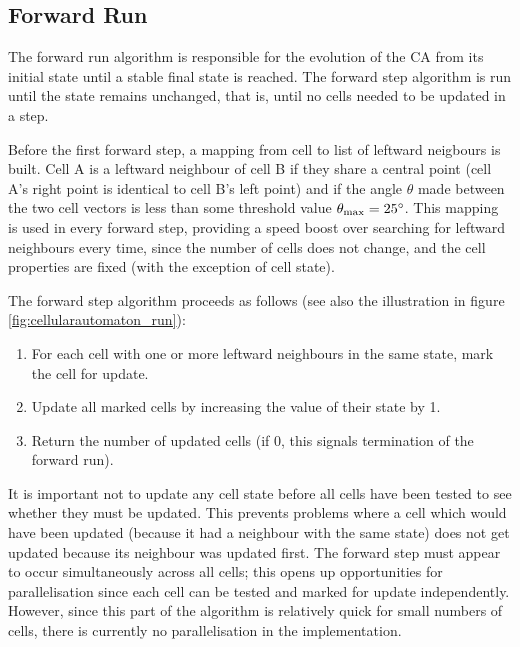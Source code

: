 \subsection{Forward Run}\label{sec:cellularautomaton_forward_run}
The forward run algorithm is responsible for the evolution of the \ac{CA} from its initial state until a stable final state is reached. The forward step algorithm is run until the state remains unchanged, that is, until no cells needed to be updated in a step.

Before the first forward step, a mapping from cell to list of leftward neigbours is built. Cell A is a leftward neighbour of cell B if they share a central point (cell A's right point is identical to cell B's left point) and if the angle $\theta$ made between the two cell vectors is less than some threshold value $\theta_\mathrm{max} = 25^\circ$. This mapping is used in every forward step, providing a speed boost over searching for leftward neighbours every time, since the number of cells does not change, and the cell properties are fixed (with the exception of cell state).

The forward step algorithm proceeds as follows (see also the illustration in figure \ref{fig:cellularautomaton_run}):
\begin{enumerate}
	\item For each cell with one or more leftward neighbours in the same state, mark the cell for update.
	\item Update all marked cells by increasing the value of their state by 1.
	\item Return the number of updated cells (if 0, this signals termination of the forward run).
\end{enumerate}

It is important not to update any cell state before all cells have been tested to see whether they must be updated. This prevents problems where a cell which would have been updated (because it had a neighbour with the same state) does not get updated because its neighbour was updated first. The forward step must appear to occur simultaneously across all cells; this opens up opportunities for parallelisation since each cell can be tested and marked for update independently. However, since this part of the algorithm is relatively quick for small numbers of cells, there is currently no parallelisation in the implementation.

